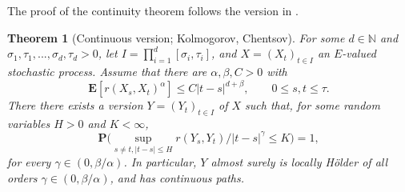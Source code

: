\documentclass{article}
\newtheorem{theorem}{Theorem}
\theoremstyle{definition}
\theoremstyle{step} \newtheorem{step}{Step}
\begin{document}
\noindent
The proof of the continuity theorem follows the version in
\cite{karatzas1991brownian}.

\begin{theorem}[Continuous version; Kolmogorov, Chentsov]
  \label{T:kolchen}
  For some $d\in\mathbb N$ and
  $\sigma_1,\tau_1,...,\sigma_d,\tau_d>0$, let $I = \prod_{i=1}^d
  [\sigma_i,\tau_i]$, and $X = (X_t)_{t\in I}$ an $E$-valued
  stochastic process. Assume that there are $\alpha, \beta, C>0$ with
  $$ \mathbf E[r(X_s, X_t)^\alpha] \leq C|t-s|^{d+\beta}, \qquad 0\leq
  s,t\leq \tau.$$ There there exists a version $Y = (Y_t)_{t\in I}$ of
  $X$ such that, for some random variables $H>0$ and $K<\infty$,
  $$ \mathbf P\Big(\sup_{s\neq t, |t-s| \leq H} r(Y_s,
  Y_t)/|t-s|^\gamma \leq K\Big) = 1,
  $$ for every $\gamma\in(0,\beta/\alpha)$. In particular, $Y$ almost
  surely is locally Hölder of all orders $\gamma\in(0,\beta/\alpha)$,
  and has continuous paths.
\end{theorem}
\end{document}
